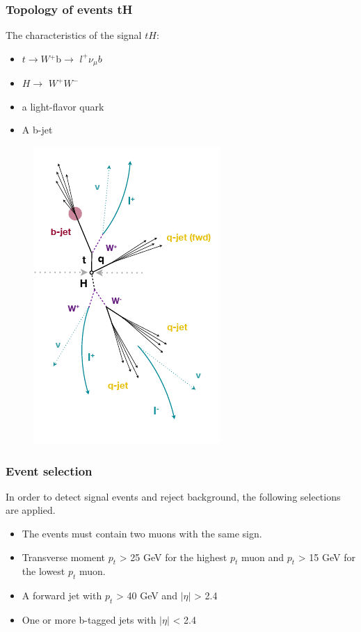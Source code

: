 \documentclass[11pt]{beamer}
\begin{document}
\begin{frame}
\frametitle{Topology of events tH}
The characteristics of the signal $tH$:

\begin{multicols}{2}
	\small{
\begin{itemize}
\item $t\rightarrow W$$^+$b$\rightarrow$ $l^+ \nu_\mu b$
\item $H\rightarrow$ $W^+$$W^-$ 

\item a light-flavor quark 
\item  A b-jet  
\end{itemize}
}
\columnbreak
\begin{figure}
	\centering
	\includegraphics[scale=0.5]{figures/jet.png}
\end{figure}
\end{multicols}
\end{frame}

\begin{frame}
\frametitle{Event selection}
In order to detect signal events and reject background, the following selections are applied. 
\begin{itemize}
	\item The events must contain two muons with the same sign.
	\item Transverse moment $p_{t}$ > 25 GeV for the highest $p_t$ muon and $p_{t}$ > 15 GeV for the lowest $p_t$ muon.
	\item A forward jet with $p_t$ > 40 GeV and $|\eta|$ > 2.4
	\item One or more b-tagged jets with $|\eta|$ < 2.4
\end{itemize}
\end{frame}
\end{document}
